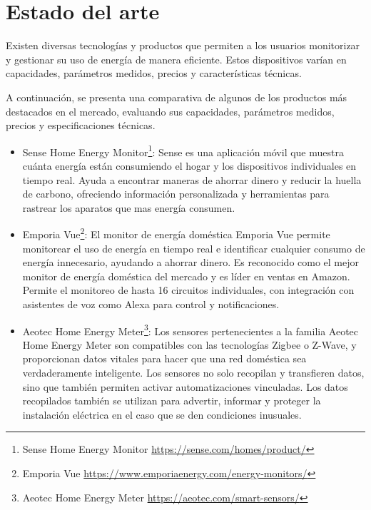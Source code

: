 \newpage

\section{Estado del arte}

Existen diversas tecnologías y productos que permiten a los usuarios monitorizar y gestionar su uso de energía de manera eficiente. Estos dispositivos varían en capacidades, parámetros medidos, precios y características técnicas. 

A continuación, se presenta una comparativa de algunos de los productos más destacados en el mercado, evaluando sus capacidades, parámetros medidos, precios y especificaciones técnicas.

\begin{itemize}
    \item Sense Home Energy Monitor\footnote{Sense Home Energy Monitor \url{https://sense.com/homes/product/}}: 
    Sense es una aplicación móvil que muestra cuánta energía están consumiendo el hogar y los dispositivos individuales en tiempo real. Ayuda a encontrar maneras de ahorrar dinero y reducir la huella de carbono, ofreciendo información personalizada y herramientas para rastrear los aparatos que mas energía consumen.

    \item Emporia Vue\footnote{Emporia Vue \url{https://www.emporiaenergy.com/energy-monitors/}}:
    El monitor de energía doméstica Emporia Vue permite monitorear el uso de energía en tiempo real e identificar cualquier consumo de energía innecesario, ayudando a ahorrar dinero. Es reconocido como el mejor monitor de energía doméstica del mercado y es líder en ventas en Amazon. Permite el monitoreo de hasta 16 circuitos individuales, con integración con asistentes de voz como Alexa para control y notificaciones.

    \item Aeotec Home Energy Meter\footnote{Aeotec Home Energy Meter \url{https://aeotec.com/smart-sensors/}}:
    Los sensores pertenecientes a la familia Aeotec Home Energy Meter son compatibles con las tecnologías Zigbee o Z-Wave, y proporcionan datos vitales para hacer que una red doméstica sea verdaderamente inteligente. Los sensores no solo recopilan y transfieren datos, sino que también permiten activar automatizaciones vinculadas. Los datos recopilados también se utilizan para advertir, informar y proteger la instalación eléctrica en el caso que se den condiciones inusuales.


\end{itemize}
